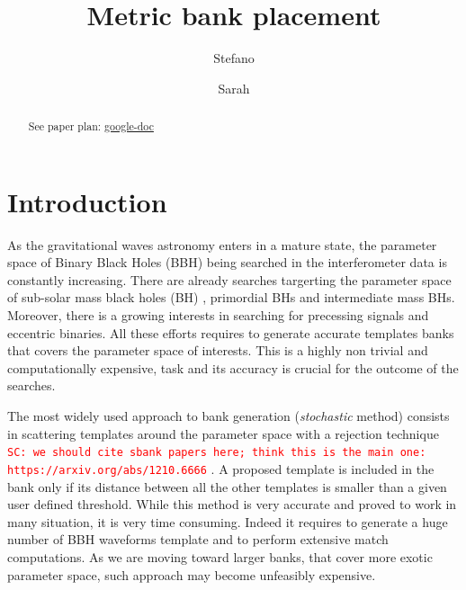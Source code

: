 \documentclass[twocolumn,showpacs,preprintnumbers,nofootinbib,prd,
superscriptaddress,10pt]{revtex4-1}
\newcommand{\sarah}[1]{{\textcolor{red}{\texttt{SC: #1}} }}
\begin{document}
\begin{abstract}
	See paper plan: \href{https://docs.google.com/document/d/1O8z0aDlXtV0LyrtK60vaQDzk9iiCsrjj1ThRGX1tX-0/edit}{google-doc}

\end{abstract}
	
	\title{Metric bank placement}
	\author{Stefano }
        
	\author{Sarah }
	\maketitle

	\tableofcontents

\section{Introduction}

As the gravitational waves astronomy enters in a mature state, the parameter space of Binary Black Holes (BBH) being searched in the interferometer data is constantly increasing. There are already searches targerting the parameter space of sub-solar mass black holes (BH) \cite{}, primordial BHs \cite{} and intermediate mass BHs. Moreover, there is a growing interests in searching for precessing signals and eccentric binaries.
All these efforts requires to generate accurate templates banks that covers the parameter space of interests. This is a highly non trivial and computationally expensive, task and its accuracy is crucial for the outcome of the searches.

The most widely used approach to bank generation ({\it stochastic} method) consists in scattering templates around the parameter space with a rejection technique \sarah{we should cite sbank papers here; think this is the main one: https://arxiv.org/abs/1210.6666}. A proposed template is included in the bank only if its distance between all the other templates is smaller than a given user defined threshold. While this method is very accurate and proved to work in many situation, it is very time consuming. Indeed it requires to generate a huge number of BBH waveforms template and to perform extensive match computations.
As we are moving toward larger banks, that cover more exotic parameter space, such approach may become unfeasibly expensive.
\end{document}
